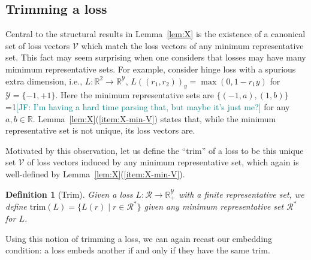 \documentclass[11pt]{article}
\newcommand{\Comments}{1}
\newcommand{\mynote}[2]{\ifnum\Comments=1\textcolor{#1}{#2}\fi}
\newcommand{\jessie}[1]{\mynote{teal}{[JF: #1]}}
\newcommand{\reals}{\mathbb{R}}
\newcommand{\R}{\mathcal{R}}
\newcommand{\V}{\mathcal{V}}
\newcommand{\Y}{\mathcal{Y}}
\newcommand{\trimcover}{\mathrm{trim}}
\newtheorem{definition}{Definition}
\begin{document}
\subsection{Trimming a loss}

Central to the structural results in Lemma~\ref{lem:X} is the existence of a canonical set of loss vectors $\V$ which match the loss vectors of any minimum representative set.
This fact may seem surprising when one considers that losses may have many mimimum representative sets.
For example, consider hinge loss with a spurious extra dimension, i.e., $L:\reals^2\to\reals^\Y$, $L((r_1, r_2))_y = \max(0,1-r_1y)$ for $\Y = \{-1,+1\}$.
Here the minimum representative sets are $\{(-1,a),(1,b)\}$ \jessie{I'm having a hard time parsing that, but maybe it's just me?} for any $a,b\in\reals$. 
Lemma~\ref{lem:X}(\ref{item:X-min-V}) states that, while the minimum representative set is not unique, its loss vectors are.

Motivated by this observation, let us define the ``trim'' of a loss to be this unique set $\V$ of loss vectors induced by any minimum representative set, which again is well-defined by Lemma~\ref{lem:X}(\ref{item:X-min-V}).
\begin{definition}[Trim]\label{def:trim-loss}
  Given a loss $L:\R \to \reals_+^\Y$ with a finite representative set, we define $\trimcover(L) = \{L(r) \mid r \in \R^*\}$ given any minimum representative set $\R^*$ for $L$.
\end{definition}


Using this notion of trimming a loss, we can again recast our embedding condition: a loss embeds another if and only if they have the same $\trimcover$.
\end{document}
